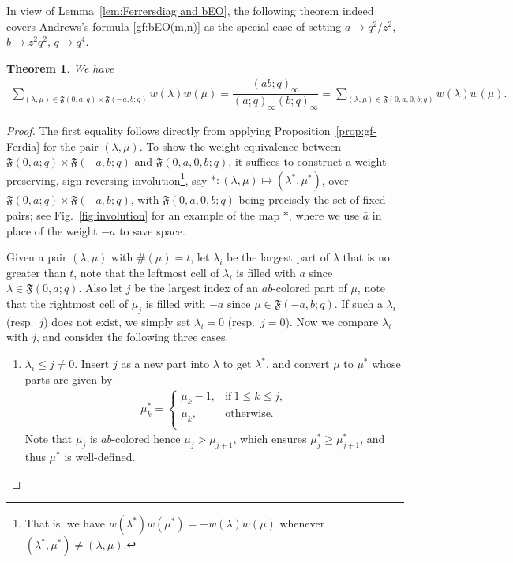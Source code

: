 \documentclass[12pt,reqno]{amsart}
\numberwithin{equation}{section}
\theoremstyle{plain}
\newtheorem{theorem}{Theorem}[section]
\theoremstyle{definition}
\def\fF{\mathfrak{F}}
\begin{document}
In view of Lemma~\ref{lem:Ferrersdiag and bEO}, the following theorem indeed covers Andrews's formula
\eqref{gf:bEO(m,n)} as the special case of setting $a\to q^2/z^2$, $b\to z^2q^2$, $q\to q^4$.

\begin{theorem}\label{thm:2-color}
We have
\begin{align}\label{eq:ab-involution}
\sum_{(\lambda,\mu)\in\mathfrak{F}(0,a;q)\times\mathfrak{F}(-a,b;q)}w(\lambda)w(\mu)
=\dfrac{(ab;q)_{\infty}}{(a;q)_{\infty}(b;q)_{\infty}}
=\sum_{(\lambda,\mu)\in\fF(0,a,0,b;q)}w(\lambda)w(\mu).
\end{align}
\end{theorem}
\begin{proof}
The first equality follows directly from applying Proposition~\ref{prop:gf-Ferdia} for the pair
$(\lambda,\mu)$. To show the weight equivalence between $\fF(0,a;q)\times\fF(-a,b;q)$ and $\fF(0,a,0,b;q)$,
it suffices to construct a weight-preserving, sign-reversing involution\footnote{That is, we have $w(\lambda^*)w(\mu^*)=-w(\lambda)w(\mu)$ whenever $(\lambda^*,\mu^*)\neq (\lambda,\mu)$.}, say
$*:(\lambda,\mu)\mapsto (\lambda^*,\mu^*)$, over $\fF(0,a;q)\times\fF(-a,b;q)$, with $\fF(0,a,0,b;q)$ being
precisely the set of fixed pairs; see Fig.~\ref{fig:involution} for an example of the map $*$, where we use
$\bar{a}$ in place of the weight $-a$ to save space.

Given a pair $(\lambda,\mu)$ with $\#(\mu)=t$, let $\lambda_i$ be the largest part of $\lambda$ that is no
greater than $t$, note that the leftmost cell of $\lambda_i$ is filled with $a$ since $\lambda\in\fF(0,a;q)$.
Also let $j$ be the largest index of an $ab$-colored part of $\mu$, note that the rightmost cell of $\mu_j$
is filled with $-a$ since $\mu\in\fF(-a,b;q)$. If such a $\lambda_i$ (resp.~$j$) does not exist, we simply
set $\lambda_i=0$ (resp.~$j=0$). Now we compare $\lambda_i$ with $j$, and consider the following three
cases.
\begin{enumerate}
\item[Case I] $\lambda_i\le j\neq 0$. Insert $j$ as a new part into $\lambda$ to get $\lambda^*$, and
convert $\mu$ to $\mu^*$ whose parts are given by
\begin{align*}
\mu^*_k=\begin{cases}
\mu_k-1, &\textrm{if}~1\le k\le j,\\
\mu_k, &\textrm{otherwise.}\\
\end{cases}
\end{align*}
Note that $\mu_j$ is $ab$-colored hence $\mu_j>\mu_{j+1}$, which ensures $\mu^*_j\ge\mu^*_{j+1}$, and thus
$\mu^*$ is well-defined.


\end{enumerate}
\end{proof}
\end{document}
